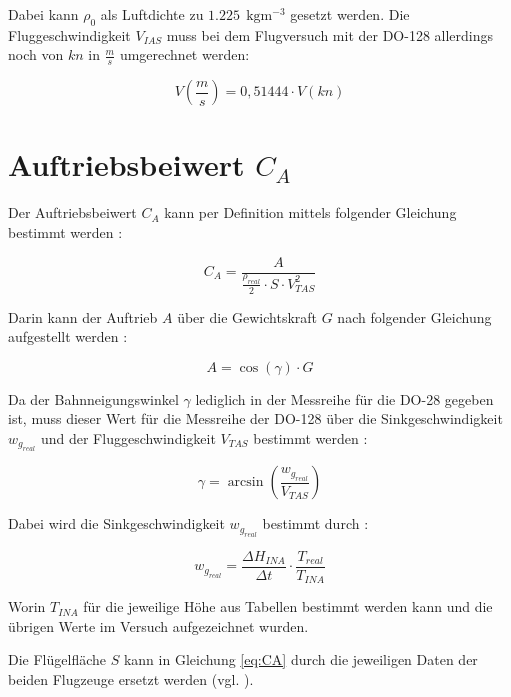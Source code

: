 Dabei kann $\rho_0$ als Luftdichte zu $\SI{1,225}{\ \kilogram\meter^{-3}}$ gesetzt werden. Die Fluggeschwindigkeit $V_{IAS}$ muss bei dem Flugversuch mit der DO-128 allerdings noch von $kn$ in $\frac{m}{s}$ umgerechnet werden:

\begin{equation}
V\left(\frac{m}{s}\right)=0,51444 \cdot V\left(kn\right)
\label{eq:V_Umrechnung}
\end{equation}


\section{Auftriebsbeiwert $C_A$}
\label{sec:CA}

Der Auftriebsbeiwert $C_A$ kann per Definition mittels folgender Gleichung bestimmt werden \cite{Skript}:

\begin{equation}
C_A=\frac{A}{\frac{\rho_{real}}{2} \cdot S \cdot V_{TAS}^2}
\label{eq:CA}
\end{equation}

Darin kann der Auftrieb $A$ über die Gewichtskraft $G$ nach folgender Gleichung aufgestellt werden \cite{Skript}:

\begin{equation}
A=\cos(\gamma) \cdot G
\label{eq:A}
\end{equation}

Da der Bahnneigungswinkel $\gamma$ lediglich in der Messreihe für die DO-28 gegeben ist, muss dieser Wert für die Messreihe der DO-128 über die Sinkgeschwindigkeit $w_{g_{real}}$ und der Fluggeschwindigkeit $V_{TAS}$ bestimmt werden \cite{Skript}:

\begin{equation}
\gamma=\arcsin\left(\frac{w_{g_{real}}}{V_{TAS}}\right)
\label{eq:gamma}
\end{equation} 

Dabei wird die Sinkgeschwindigkeit $w_{g_{real}}$ bestimmt durch \cite{Kurzskript}:

\begin{equation}
w_{g_{real}}=\frac{\Delta H_{INA}}{\Delta t} \cdot \frac{T_{real}}{T_{INA}}
\end{equation}

Worin $T_{INA}$ für die jeweilige Höhe aus Tabellen bestimmt werden kann und die übrigen Werte im Versuch aufgezeichnet wurden.

Die Flügelfläche $S$ kann in Gleichung \ref{eq:CA} durch die jeweiligen Daten der beiden Flugzeuge ersetzt werden (vgl. \cite{Kurzskript}).

